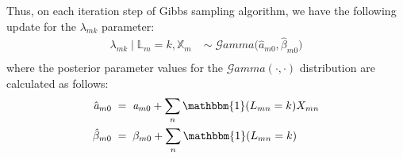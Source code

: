 Thus, on each iteration step of Gibbs sampling algorithm, we have the following update for the $\lambda_{mk}$ parameter:
\begin{equation}
  \begin{aligned}
  	\lambda_{mk} \mid \mathbb{L}_{m}=k, \mathbb{X}_{m} \;& \sim \;\mathcal{G}amma\big(\hat{\mathit{a}}_{m0}, \hat{\beta}_{m0}\big) \\
  \end{aligned}
\end{equation}
where the posterior parameter values for the $\mathcal{G}amma(\cdot,\cdot)$ distribution are calculated as follows:
\begin{equation}
  \begin{aligned}
  	\hat{\mathit{a}}_{m0} \; &= \; \mathit{a}_{m0} + \sum_{n}\mathbbm{1}(L_{mn}=k)X_{mn} \\
  	\hat{\beta}_{m0} \; &= \; \beta_{m0} +  \sum_{n}\mathbbm{1}(L_{mn}=k)
  \end{aligned}
\end{equation}
